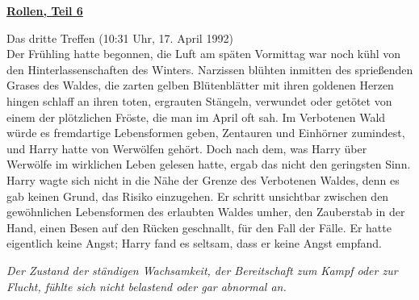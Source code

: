 

\hypertarget{rollen-teil-6}{%

\textbf{\uline{Rollen, Teil 6}}

Das dritte Treffen (10:31 Uhr, 17. April 1992)\\ Der Frühling hatte begonnen, die Luft am späten Vormittag war noch kühl von den Hinterlassenschaften des Winters. Narzissen blühten inmitten des sprießenden Grases des Waldes, die zarten gelben Blütenblätter mit ihren goldenen Herzen hingen schlaff an ihren toten, ergrauten Stängeln, verwundet oder getötet von einem der plötzlichen Fröste, die man im April oft sah. Im Verbotenen Wald würde es fremdartige Lebensformen geben, Zentauren und Einhörner zumindest, und Harry hatte von Werwölfen gehört. Doch nach dem, was Harry über Werwölfe im wirklichen Leben gelesen hatte, ergab das nicht den geringsten Sinn. Harry wagte sich nicht in die Nähe der Grenze des Verbotenen Waldes, denn es gab keinen Grund, das Risiko einzugehen. Er schritt unsichtbar zwischen den gewöhnlichen Lebensformen des erlaubten Waldes umher, den Zauberstab in der Hand, einen Besen auf den Rücken geschnallt, für den Fall der Fälle. Er hatte eigentlich keine Angst; Harry fand es seltsam, dass er keine Angst empfand.

\emph{Der Zustand der ständigen Wachsamkeit, der Bereitschaft zum Kampf oder zur Flucht, fühlte sich nicht belastend oder gar abnormal an.}

}
